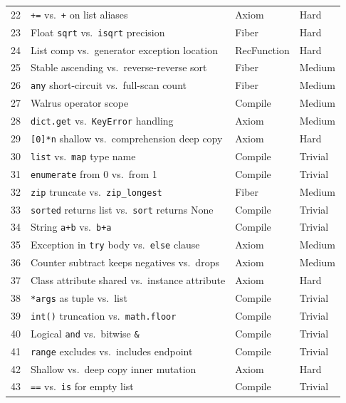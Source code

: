 \begin{center}
\begin{tabular}{r p{5cm} l l}
  22 & \texttt{+=} vs.\ \texttt{+} on list aliases &
       Axiom & Hard \\
  23 & Float \texttt{sqrt} vs.\ \texttt{isqrt} precision &
       Fiber & Hard \\
  24 & List comp vs.\ generator exception location &
       RecFunction & Hard \\
  25 & Stable ascending vs.\ reverse-reverse sort &
       Fiber & Medium \\
  26 & \texttt{any} short-circuit vs.\ full-scan count &
       Fiber & Medium \\
  27 & Walrus operator scope &
       Compile & Medium \\
  28 & \texttt{dict.get} vs.\ \texttt{KeyError} handling &
       Axiom & Medium \\
  29 & \texttt{[0]*n} shallow vs.\ comprehension deep copy &
       Axiom & Hard \\
  30 & \texttt{list} vs.\ \texttt{map} type name &
       Compile & Trivial \\
  31 & \texttt{enumerate} from 0 vs.\ from 1 &
       Compile & Trivial \\
  32 & \texttt{zip} truncate vs.\ \texttt{zip\_longest} &
       Fiber & Medium \\
  33 & \texttt{sorted} returns list vs.\ \texttt{sort} returns None &
       Compile & Trivial \\
  34 & String \texttt{a+b} vs.\ \texttt{b+a} &
       Compile & Trivial \\
  35 & Exception in \texttt{try} body vs.\ \texttt{else} clause &
       Axiom & Medium \\
  36 & Counter subtract keeps negatives vs.\ drops &
       Axiom & Medium \\
  37 & Class attribute shared vs.\ instance attribute &
       Axiom & Hard \\
  38 & \texttt{*args} as tuple vs.\ list &
       Compile & Trivial \\
  39 & \texttt{int()} truncation vs.\ \texttt{math.floor} &
       Compile & Trivial \\
  40 & Logical \texttt{and} vs.\ bitwise \texttt{\&} &
       Compile & Trivial \\
  41 & \texttt{range} excludes vs.\ includes endpoint &
       Compile & Trivial \\
  42 & Shallow vs.\ deep copy inner mutation &
       Axiom & Hard \\
  43 & \texttt{==} vs.\ \texttt{is} for empty list &
       Compile & Trivial \\

\end{tabular}
\end{center}
